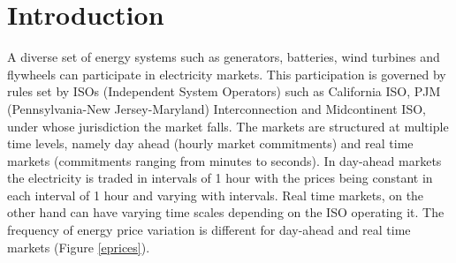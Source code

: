 \documentclass[11pt,twoside]{article}
\begin{document}
\section{Introduction}
A diverse set of energy systems such as generators, batteries, wind turbines and flywheels can participate in electricity markets. This participation is governed by rules set by ISOs (Independent System Operators) such as California ISO, PJM (Pennsylvania-New Jersey-Maryland) Interconnection and Midcontinent ISO, under whose jurisdiction the market falls. The markets are structured at multiple time levels, namely day ahead (hourly market commitments) and real time markets (commitments ranging from minutes to seconds). In day-ahead markets the electricity is traded in intervals of 1 hour with the prices being constant in each interval of 1 hour and varying with intervals. Real time markets, on the other hand can have varying time scales depending on the ISO operating it. The frequency of energy price variation is different for day-ahead and real time markets (Figure \ref{eprices}). 
\end{document}
